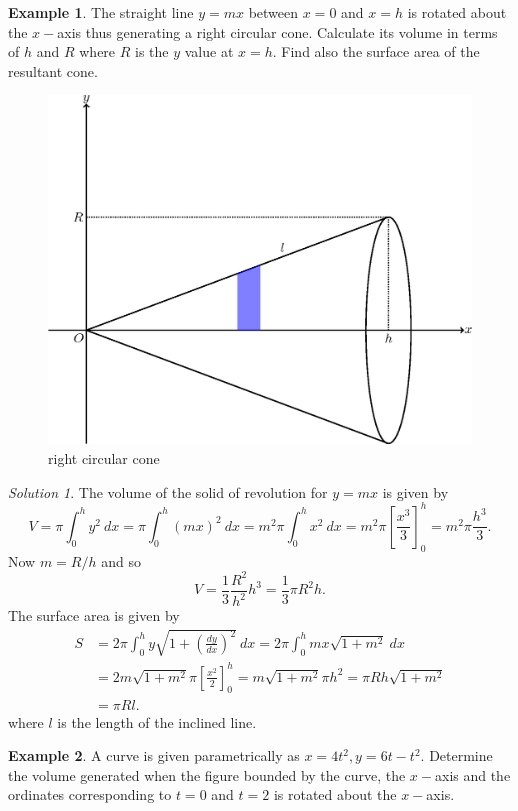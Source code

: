 \documentclass[
  11pt,
  oneside]{book}
\newcommand{\slide}{}
\theoremstyle{definition}
\theoremstyle{definition}
\newtheorem{example}{Example}[chapter]
\theoremstyle{definition}
\theoremstyle{definition}
\theoremstyle{remark}
\newtheorem*{solution}{Solution}
\begin{document}
\begin{example}
\leavevmode

The straight line \(y=mx\) between \(x=0\) and \(x=h\) is rotated about the \(x-\)axis thus generating a right circular cone. Calculate its volume in terms of \(h\) and \(R\) where \(R\) is the \(y\) value at \(x=h\). Find also the surface area of the resultant cone.

\begin{figure}

{\centering \includegraphics[width=0.5\linewidth]{tikztopng-figure42} 

}

\caption{right circular cone}\label{fig:unnamed-chunk-72}
\end{figure}

\end{example}

\begin{solution}
The volume of the solid of revolution for \(y = mx\) is given by
\[
V = \pi\int_0^hy^2\ dx = \pi\int_0^h (mx)^2\ dx = m^2\pi\int_0^hx^2\ dx = m^2\pi\left[\frac{x^3}3\right]_0^h = m^2\pi\frac{h^3}3.
\]
Now \(m = R/h\) and so
\[
V = \frac13\frac{R^2}{h^2}h^3 = \frac13\pi R^2h.
\]
The surface area is given by
\begin{align*}
S&= 2\pi\int_0^hy\sqrt{1+\left(\frac{dy}{dx}\right)^2}\ dx = 2\pi\int_0^h mx\sqrt{1+m^2}\ dx\\
&= 2m\sqrt{1+m^2}\pi\left[\frac{x^2}2\right]_0^h = m\sqrt{1+m^2}\pi h^2 = \pi R h\sqrt{1+m^2}\\
&= \pi Rl.
\end{align*}
where \(l\) is the length of the inclined line.
\end{solution}

\slide

\begin{example}
A curve is given parametrically as \(x=4t^2, y = 6t-t^2\). Determine the volume generated when the figure bounded by the curve, the \(x-\)axis and the ordinates corresponding to \(t=0\) and \(t=2\) is rotated about the \(x-\)axis.
\end{example}
\end{document}
